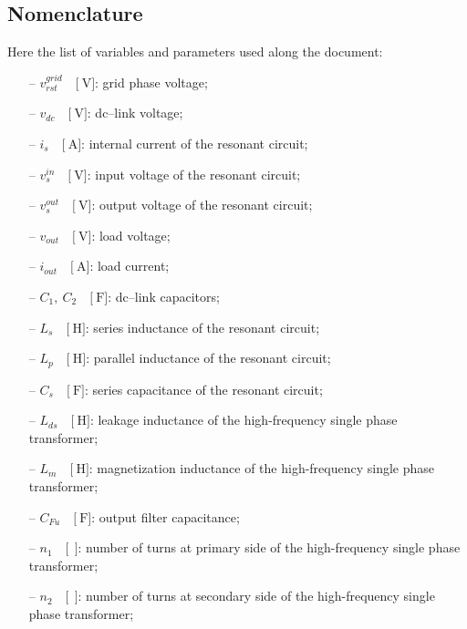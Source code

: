 \documentclass[11pt,a4paper,oneside]{book}
\numberwithin{equation}{section}
\theoremstyle{it}
\theoremstyle{definition}
\begin{document}
\begin{onehalfspace}
\section*{Nomenclature}
Here the list of variables and parameters used along the document: 
	\begin{itemize}
		\item[--] $v_{rst}^{grid}\quad\Big[\SI{}{\volt}\Big]$: grid phase voltage;
		\item[--] $v_{dc}\quad\Big[\SI{}{\volt}\Big]$: dc--link voltage;
		\item[--] $i_{s}\quad\Big[\SI{}{\ampere}\Big]$: internal current of the resonant circuit;
		\item[--] $v_s^{in}\quad\Big[\SI{}{\volt}\Big]$: input voltage of the resonant circuit;
		\item[--] $v_s^{out}\quad\Big[\SI{}{\volt}\Big]$: output voltage of the resonant circuit;
		\item[--] $v_{out}\quad\Big[\SI{}{\volt}\Big]$: load voltage;		
		\item[--] $i_{out}\quad\Big[\SI{}{\ampere}\Big]$: load current;		
		\item[--] $C_{1},\ C_2\quad\Big[\SI{}{\farad}\Big]$: dc--link capacitors;
		\item[--] $L_{s}\quad\Big[\SI{}{\henry}\Big]$: series inductance of the resonant circuit;
		\item[--] $L_{p}\quad\Big[\SI{}{\henry}\Big]$: parallel inductance of the resonant circuit;
		\item[--] $C_{s}\quad\Big[\SI{}{\farad}\Big]$: series capacitance of the resonant circuit;
		\item[--] $L_{ds}\quad\Big[\SI{}{\henry}\Big]$: leakage inductance of the high-frequency single phase transformer;
		\item[--] $L_{m}\quad\Big[\SI{}{\henry}\Big]$: magnetization inductance of the high-frequency single phase transformer;	
		\item[--] $C_{Fu}\quad\Big[\SI{}{\farad}\Big]$: output filter capacitance;
		\item[--] $n_1\quad\Big[\SI{}{\ }\Big]$: number of turns at primary side of the high-frequency single phase transformer;
		\item[--] $n_2\quad\Big[\SI{}{\ }\Big]$: number of turns at secondary side of the high-frequency single phase transformer;
	\end{itemize}


\end{onehalfspace}
\end{document}
